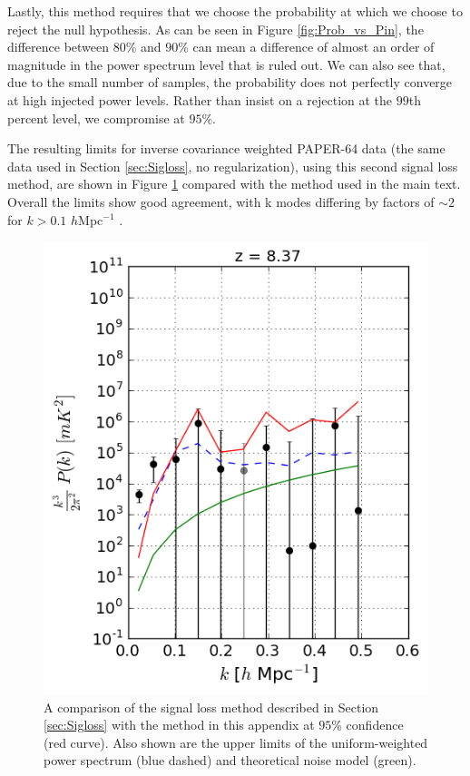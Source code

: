 \documentclass[preprint2,numberedappendix,tighten]{aastex6}  %
\begin{document}
Lastly, this method requires that we choose the probability at which we choose to reject the null hypothesis. As can be seen in Figure \ref{fig:Prob_vs_Pin}, the difference between $80$\% and $90$\% can mean a difference of almost an order of magnitude in the power spectrum level that is ruled out. We can also see that, due to the small number of samples, the probability does not perfectly converge at high injected power levels. Rather than insist on a rejection at the $99$th percent level, we compromise at $95$\%.

The resulting limits for inverse covariance weighted PAPER-64 data (the same data used in Section \ref{sec:Sigloss}, no regularization), using this second signal loss method, are shown in Figure \ref{fig:sigloss_compare} compared with the method used in the main text. Overall the limits show good agreement, with k modes differing by factors of $\sim$$2$ for $k > 0.1$ $h$Mpc$^{-1}$ .  

\begin{figure}[t]
\centering
\includegraphics[width=.4\textwidth]{plots/sigloss_method_comparison_95.png}
\caption{A comparison of the signal loss method described in Section \ref{sec:Sigloss}
with the method in this appendix at $95$\% confidence (red curve).
Also shown are the upper limits of the uniform-weighted power spectrum
(blue dashed) and theoretical noise model (green).} 
\label{fig:sigloss_compare} 
\end{figure}



\end{document}
